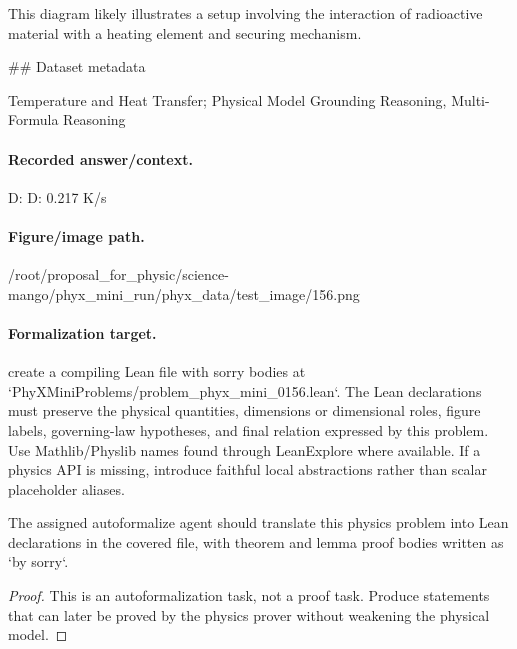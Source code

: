 This diagram likely illustrates a setup involving the interaction of radioactive material with a heating element and securing mechanism.

\#\# Dataset metadata

Temperature and Heat Transfer; Physical Model Grounding Reasoning, Multi-Formula Reasoning

\paragraph{Recorded answer/context.}
D: D: 0.217 K/s

\paragraph{Figure/image path.}
/root/proposal\_for\_physic/science-mango/phyx\_mini\_run/phyx\_data/test\_image/156.png

\paragraph{Formalization target.}
create a compiling Lean file with sorry bodies at `PhyXMiniProblems/problem\_phyx\_mini\_0156.lean`. The Lean declarations must preserve the physical quantities, dimensions or dimensional roles, figure labels, governing-law hypotheses, and final relation expressed by this problem.
Use Mathlib/Physlib names found through LeanExplore where available. If a physics API is missing, introduce faithful local abstractions rather than scalar placeholder aliases.

\begin{theorem}
\label{thm:physics:phyx_mini_0156:target}
The assigned autoformalize agent should translate this physics problem into Lean declarations in the covered file, with theorem and lemma proof bodies written as `by sorry`.
\end{theorem}
\begin{proof}
This is an autoformalization task, not a proof task. Produce statements that can later be proved by the physics prover without weakening the physical model.
\end{proof}

